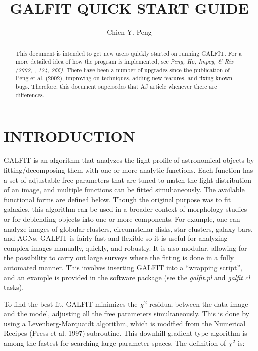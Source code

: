 \documentclass[preprint]{aastex}
\begin{document}

\title{GALFIT QUICK START GUIDE}

\author {Chien Y. Peng}

\begin {abstract}

This document is intended to get new users quickly started on running GALFIT.
For a more detailed idea of how the program is implemented, see {\it Peng, Ho,
Impey, \& Rix (2002, \aj, 124, 266).} There have been a number of upgrades
since the publication of Peng et al. (2002), improving on techniques, adding
new features, and fixing known bugs.  Therefore, this document supersedes that
AJ article whenever there are differences.

\end {abstract}

\section {INTRODUCTION}

GALFIT is an algorithm that analyzes the light profile of astronomical objects
by fitting/decomposing them with one or more analytic functions.  Each
function has a set of adjustable free parameters that are tuned to match the
light distribution of an image, and multiple functions can be fitted
simultaneously.  The available functional forms are defined below.  Though the
original purpose was to fit galaxies, this algorithm can be used in a broader
context of morphology studies or for deblending objects into one or more
components.  For example, one can analyze images of globular clusters,
circumstellar disks, star clusters, galaxy bars, and AGNs.  GALFIT is fairly
fast and flexible so it is useful for analyzing complex images manually,
quickly, and robustly.  It is also modular, allowing for the possibility to
carry out large surveys where the fitting is done in a fully automated manner.
This involves inserting GALFIT into a ``wrapping script'', and an example is
provided in the software package (see the {\it galfit.pl} and {\it galfit.cl}
tasks).

To find the best fit, GALFIT minimizes the $\chi^2$ residual between the data
image and the model, adjusting all the free parameters simultaneously.  This
is done by using a Levenberg-Marquardt algorithm, which is modified from the
Numerical Recipes (Press et al.  1997) subroutine.  This
downhill-gradient-type algorithm is among the fastest for searching large
parameter spaces.  The definition of $\chi^2$ is:
\end{document}
